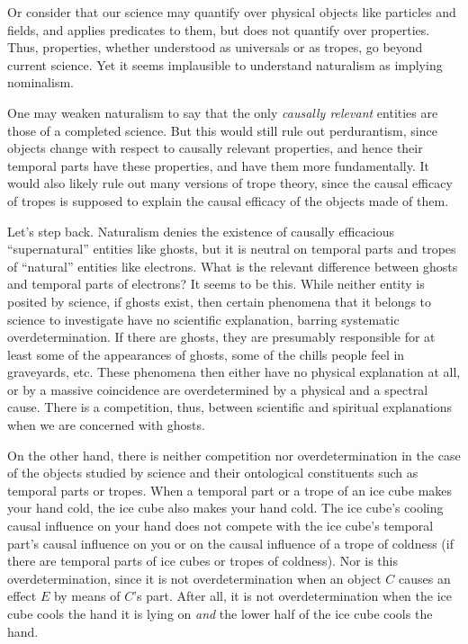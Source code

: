 Or consider that our science may quantify over physical objects like particles and fields, and applies predicates to them, but 
does not quantify over properties. Thus, properties, whether understood as universals or as tropes, go beyond current science.
Yet it seems implausible to understand naturalism as implying nominalism.

One may weaken naturalism to say that the only \textit{causally relevant} entities are those of a completed science. But 
this would still rule out perdurantism, since objects change with respect to causally relevant properties, and hence their
temporal parts have these properties, and have them more fundamentally. It would also likely rule out many versions of trope
theory, since the causal efficacy of tropes is supposed to explain the causal efficacy of the objects made of them.

Let's step back. Naturalism denies the existence of causally efficacious ``supernatural'' entities like 
ghosts, but it is neutral on temporal parts and tropes of ``natural'' entities like electrons. 
What is the relevant difference between ghosts and temporal parts of electrons? It seems to be this. While
neither entity is posited by science, if ghosts exist, then certain phenomena that it belongs to science 
to investigate have no scientific explanation, barring systematic overdetermination. If there are ghosts,
they are presumably responsible for at least some of the appearances of ghosts, some of the chills people
feel in graveyards, etc. These phenomena then either have no physical explanation at all, or by a massive
coincidence are overdetermined by a physical and a spectral cause. There is a competition, thus, between 
scientific and spiritual explanations when we are concerned with ghosts. 

On the other hand, there is neither
competition nor overdetermination in the case of the objects studied by science and their ontological
constituents such as temporal parts or tropes. When a temporal part or a trope of an ice cube makes 
your hand cold, the ice cube also makes your hand cold. The ice cube's cooling causal influence on your hand
does not compete with the ice cube's temporal part's causal influence on you or on the causal influence of 
a trope of coldness (if there are temporal parts of ice cubes or tropes of coldness). Nor is this overdetermination,
since it is not overdetermination when an object $C$ causes an effect $E$ by means of $C$'s part. After all,
it is not overdetermination when the ice cube cools the hand it is lying on \textit{and} the lower half of 
the ice cube cools the hand. 

